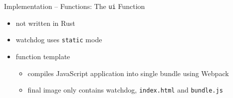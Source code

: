 \begin{frame}{Implementation -- Functions: The \texttt{ui} Function}
  \begin{itemize}
    \item not written in Rust
    \item watchdog uses \texttt{static} mode
    \item function template
    \begin{itemize}
      \item compiles JavaScript application into single bundle using Webpack
      \item final image only contains watchdog, \texttt{index.html} and \texttt{bundle.js}
    \end{itemize}
  \end{itemize}
\end{frame}

